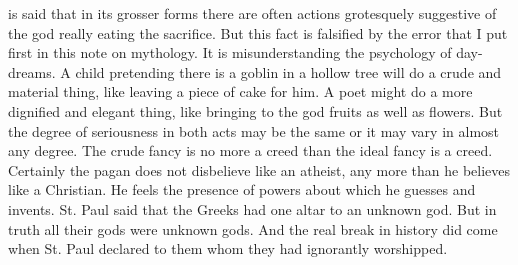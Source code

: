 is said that in its grosser forms there are often actions grotesquely suggestive of the god really eating the sacrifice. But this fact is falsified by the error that I put first in this note on mythology. It is misunderstanding the psychology of day-dreams. A child pretending there is a goblin in a hollow tree will do a crude and material thing, like leaving a piece of cake for him. A poet might do a more dignified and elegant thing, like bringing to the god fruits as well as flowers. But the degree of seriousness in both acts may be the same or it may vary in almost any degree. The crude fancy is no more a creed than the ideal fancy is a creed. Certainly the pagan does not disbelieve like an atheist, any more than he believes like a Christian. He feels the presence of powers about which he guesses and invents. St. Paul said that the Greeks had one altar to an unknown god. But in truth all their gods were unknown gods. And the real break in history did come when St. Paul declared to them whom they had ignorantly worshipped.

